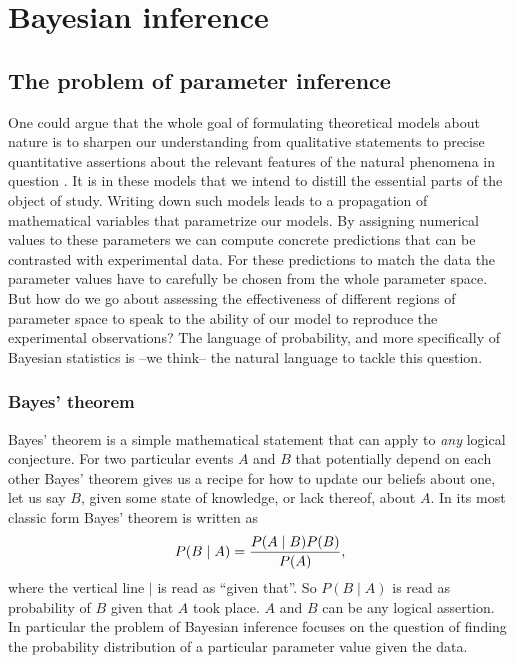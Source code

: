 \section{Bayesian inference}
\label{sec:bayesian}

\subsection{The problem of parameter inference}

One could argue that the whole goal of formulating theoretical models about
nature is to sharpen our understanding from qualitative statements to precise
quantitative assertions about the relevant features of the natural phenomena in
question \cite{Gunawardena2014}. It is in these models that we intend to distill
the essential parts of the object of study. Writing down such models leads to a
propagation of mathematical variables that parametrize our models. By assigning
numerical values to these parameters we can compute concrete predictions that
can be contrasted with experimental data. For these predictions to match the
data the parameter values have to carefully be chosen from the whole parameter
space. But how do we go about assessing the effectiveness of different regions
of parameter space to speak to the ability of our model to reproduce the
experimental observations? The language of probability, and more specifically of
Bayesian statistics is --we think-- the natural language to tackle this
question.

\subsubsection{Bayes' theorem}

Bayes' theorem is a simple mathematical statement that can apply to \textit{any}
logical conjecture. For two particular events $A$ and $B$ that potentially 
depend on each other Bayes' theorem gives us a recipe for how to update our 
beliefs about one, let us say $B$, given some state of knowledge, or lack thereof, about
$A$. In its most classic form Bayes' theorem is written as
\begin{equation}
P(B \mid A) = {P(A \mid B) P(B) \over P(A)},
\end{equation}
where the vertical line $\mid$ is read as ``given that''. So $P(B \mid A)$ is
read as probability of $B$ given that $A$ took place. $A$ and $B$ can be any
logical assertion. In particular the problem of Bayesian inference focuses on
the question of finding the probability distribution of a particular parameter
value given the data.

